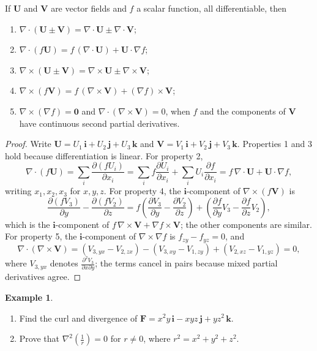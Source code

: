 \documentclass[11pt,a4paper]{article}
\theoremstyle{definition}
\newtheorem{exa}[thm]{Example}
\begin{document}
If $\mathbf U$ and $\mathbf V$ are vector fields and $f$ a scalar function, all
differentiable, then
\begin{enumerate}
\item $\nabla \cdot(\mathbf U\pm \mathbf V) = \nabla \cdot \mathbf U \pm \nabla
\cdot \mathbf V$;

\item $\nabla \cdot (f\mathbf U) = f\,(\nabla\cdot \mathbf U) + \mathbf U\cdot
\nabla f$;

\item $\nabla\times (\mathbf U\pm\mathbf V) = \nabla\times\mathbf U \pm
\nabla\times \mathbf V$;

\item $\nabla\times(f\mathbf V) = f\,(\nabla \times \mathbf V) + (\nabla
f)\times \mathbf V$;

\item $\nabla\times(\nabla f) = \mathbf 0$ and $\nabla\cdot(\nabla\times\mathbf
V) = 0$, when $f$ and the components of $\mathbf V$ have continuous second
partial derivatives.
\end{enumerate}

\begin{proof}
Write $\mathbf U = U_1\,\mathbf i + U_2\,\mathbf j + U_3\,\mathbf k$ and
$\mathbf V = V_1\,\mathbf i + V_2\,\mathbf j + V_3\,\mathbf k$. Properties 1 and
3 hold because differentiation is linear. For property 2,
\[\nabla\cdot(f\mathbf U) = \sum_{i}\frac{\partial (fU_i)}{\partial x_i} =
\sum_i f\frac{\partial U_i}{\partial x_i} + \sum_i U_i\frac{\partial f}{\partial
x_i} = f\,\nabla\cdot\mathbf U + \mathbf U\cdot\nabla f ,\]
writing $x_1, x_2, x_3$ for $x, y, z$. For property 4, the $\mathbf i$-component
of $\nabla\times(f\mathbf V)$ is
\[\frac{\partial(fV_3)}{\partial y} - \frac{\partial(fV_2)}{\partial z} =
f\left(\frac{\partial V_3}{\partial y} - \frac{\partial V_2}{\partial z}\right) +
\left(\frac{\partial f}{\partial y}V_3 - \frac{\partial f}{\partial
z}V_2\right),\]
which is the $\mathbf i$-component of $f\,\nabla\times\mathbf V + \nabla f\times
\mathbf V$; the other components are similar. For property 5, the
$\mathbf i$-component of $\nabla\times\nabla f$ is $f_{zy} - f_{yz} = 0$, and
\[\nabla\cdot(\nabla\times\mathbf V) = (V_{3,yx} - V_{2,zx}) - (V_{3,xy} -
V_{1,zy}) + (V_{2,xz} - V_{1,yz}) = 0 ,\]
where $V_{3,yx}$ denotes $\frac{\partial^2V_3}{\partial x\partial y}$; the terms
cancel in pairs because mixed partial derivatives agree.
\end{proof}

\begin{exa}
\label{ex:divcurl}
\begin{enumerate}
\item Find the curl and divergence of
$\mathbf F = x^2y\,\mathbf i - xyz\,\mathbf j + yz^2\,\mathbf k$.

\item Prove that $\nabla^2\left(\frac{1}{r}\right) = 0$ for $r\neq 0$, where
$r^2 = x^2 + y^2 + z^2$.
\end{enumerate}
\end{exa}
\end{document}
